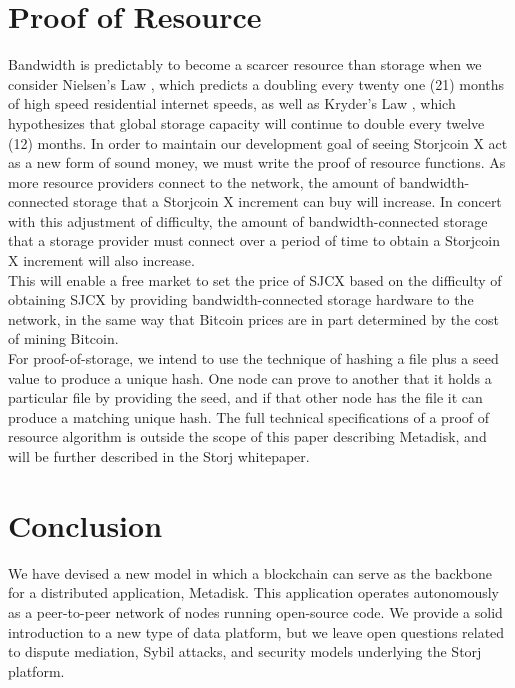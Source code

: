 \documentclass[a4paper,10pt]{article}
\begin{document}
\section{Proof of Resource}

Bandwidth is predictably to become a scarcer resource than storage when we consider Nielsen’s Law \cite{16}, which predicts a doubling every twenty one (21) months of high speed residential internet speeds, as well as Kryder’s Law \cite{17}, which hypothesizes that global storage capacity will continue to double every twelve (12) months.  In order to maintain our development goal of seeing Storjcoin X act as a new form of sound money, we must write the proof of resource functions. As more resource providers connect to the network, the amount of bandwidth-connected storage that a Storjcoin X increment can buy will increase.  In concert with this adjustment of difficulty, the amount of bandwidth-connected storage that a storage provider must connect over a period of time to obtain a Storjcoin X increment will also increase.  \\

This will enable a free market to set the price of SJCX based on the difficulty of obtaining SJCX by providing bandwidth-connected storage hardware to the network, in the same way that Bitcoin prices are in part determined by the cost of mining Bitcoin. \\

For proof-of-storage, we intend to use the technique of hashing a file plus a seed value to produce a unique hash. One node can prove to another that it holds a particular file by providing the seed, and if that other node has the file it can produce a matching unique hash. The full technical specifications of a proof of resource algorithm is outside the scope of this paper describing Metadisk, and will be further described in the Storj whitepaper.

\section{Conclusion}

We have devised a new model in which a blockchain can serve as the backbone for a distributed application, Metadisk. This application operates autonomously as a peer-to-peer network of nodes running open-source code. We provide a solid introduction to a new type of data platform, but we leave open questions related to dispute mediation, Sybil attacks, and security models underlying the Storj platform.\\


\begingroup
  \raggedright
  
\endgroup
\end{document}
